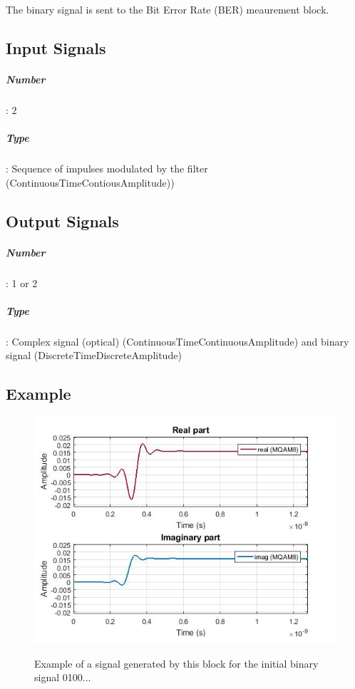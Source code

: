 \documentclass[a4paper]{article}
\begin{document}
The binary signal is sent to the Bit Error Rate (BER) meaurement block.

\subsection*{Input Signals}

\subparagraph*{Number}: 2

\subparagraph*{Type}: Sequence of impulses modulated by the filter (ContinuousTimeContiousAmplitude))

\subsection*{Output Signals}

\subparagraph*{Number}: 1 or 2

\subparagraph*{Type}: Complex signal (optical) (ContinuousTimeContinuousAmplitude) and binary signal (DiscreteTimeDiscreteAmplitude)

\subsection*{Example}
\begin{figure}[h]
	\centering
	\includegraphics[width=\textwidth]{IQmodulator0_output}
	\label{MQAM8_DeterministicAppendZeros}\caption{Example of a signal generated by this block for the initial binary signal 0100...}
\end{figure}

\end{document}

